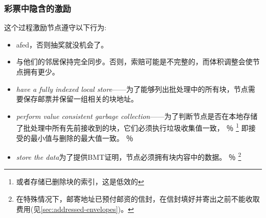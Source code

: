 



\subsubsection{彩票中隐含的激励}

这个过程激励节点遵守以下行为:

\begin{itemize}
\item afed，否则抽奖就没机会了。
\item 与他们的邻居保持完全同步。否则，索赔可能是不完整的，而体积调整会使节点拥有更少。
\item \emph{have a fully indexed local store}——为了能够列出批处理中的所有块，节点需要保存邮票并保留一组相关的块地址。 
\item \emph{perform value consistent garbage collection}——为了判断节点是否在本地存储了批处理中所有先前接收到的块，它们必须执行垃圾收集值一致，%
％
\footnote{或者存储已删除块的索引，这是低效的}
即接受的最小值与删除的最大值一致。
％
\item \emph{store the data}为了提供BMT证明，节点必须拥有块内容中的数据。%
％
\footnote{在特殊情况下，邮寄地址已预付邮资的信封，在信封填好并寄出之前不能收取费用(见\ref{sec:addressed-envelopes})。}
\end{itemize}


